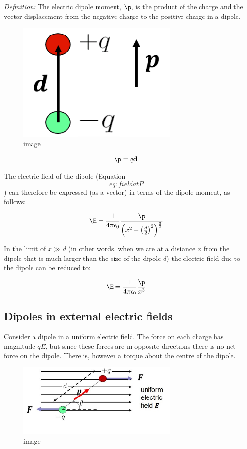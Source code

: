 \documentclass[
]{book}
\begin{document}
\emph{Definition:} The electric dipole moment, \(\p\), is the product of the
charge and the vector displacement from the negative charge to the
positive charge in a dipole.

\begin{figure}
\centering
\includegraphics[width=80mm,height=\textheight]{Figures/dipole_moment.png}
\caption{image}
\end{figure}

\[\p = q \mathbf{d}\]

The electric field of the dipole (Equation
\protect\hyperlink{eq:fieldatP}{\[eq:fieldatP\]}) can therefore be expressed (as a vector) in
terms of the dipole moment, as follows:

\[\label{eq:fieldatP}
\E = \frac{1}{4 \pi \epsilon_0} \frac{\p}{\left( x^2 + \left( \frac{d}{2} \right)^2 \right)^{\frac{3}{2}}}\]

In the limit of \(x \gg d\) (in other words, when we are at a distance \(x\)
from the dipole that is much larger than the size of the dipole \(d\)) the
electric field due to the dipole can be reduced to:

\[\E = \frac{1}{4\pi \epsilon_0} \frac{\p}{x^3}\]

\hypertarget{dipoles-in-external-electric-fields}{%
\subsection{Dipoles in external electric fields}\label{dipoles-in-external-electric-fields}}

Consider a dipole in a uniform electric field. The force on each charge
has magnitude \(qE\), but since these forces are in opposite directions
there is no net force on the dipole. There is, however a torque about
the centre of the dipole.

\begin{figure}
\centering
\includegraphics[width=80mm,height=\textheight]{Figures/dipole_extE.jpg}
\caption{image}
\end{figure}
\end{document}
